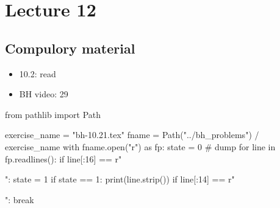 \section{Lecture 12}


\subsection{Compulory material}
\label{sec:compulory-material}


\begin{itemize}
\item 10.2: read
\item BH video: 29
\end{itemize}



\begin{pycode}
from pathlib import Path

exercise_name = "bh-10.21.tex"
fname = Path("../bh_problems") / exercise_name
with fname.open("r") as fp:
    state = 0  # dump
    for line in fp.readlines():
        if line[:16] == r"\begin{exercise}":
            state = 1
        if state == 1:
            print(line.strip())
        if line[:14] == r"\end{exercise}":
            break
\end{pycode}



